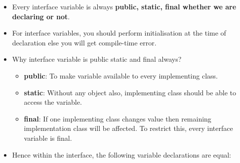 \setlength{\columnsep}{3pt}
\begin{flushleft}
	
	\begin{itemize}
		\item Every interface variable is always \textbf{public, static, final whether we are declaring or not}.
		\item For interface variables, you should perform initialisation at the time of declaration else you will get compile-time error.
		\bigskip
	
		\bigskip
		\item Why interface variable is public static and final always?
		\begin{itemize}
			\item \textbf{public}: To make variable available to every implementing class.
			\item \textbf{static}: Without any object also, implementing class should be able to access the variable.
			\item \textbf{final}: If one implementing class changes value then remaining implementation class will be affected. To restrict this, every interface variable is final.
		\end{itemize}
		\item Hence within the interface, the following variable declarations are equal:
		\bigskip
		
		
	\end{itemize}
	
	
\end{flushleft}
\newpage

